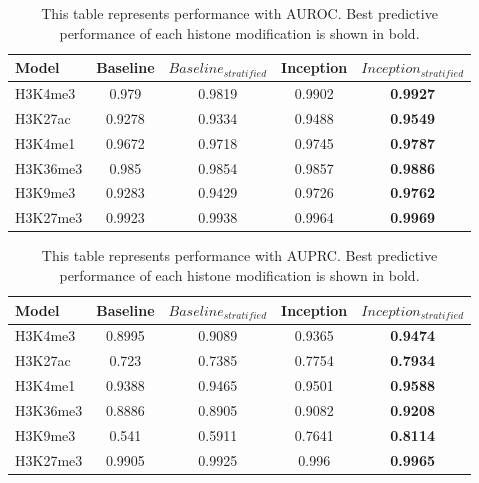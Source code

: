 \begin{table}[H]%
    \centering
    \begin{tabular}{lcccc}
    \hline
    Model & Baseline & $Baseline_{stratified}$ & Inception & $Inception_{stratified}$ \\\hline
    H3K4me3 & 0.979 & 0.9819 & 0.9902 & \textbf{0.9927} \\
    H3K27ac & 0.9278 & 0.9334 & 0.9488 & \textbf{0.9549} \\
    H3K4me1 & 0.9672 & 0.9718 & 0.9745 & \textbf{0.9787} \\
    H3K36me3 & 0.985 & 0.9854 & 0.9857 & \textbf{0.9886} \\
    H3K9me3 & 0.9283 & 0.9429 & 0.9726 & \textbf{0.9762} \\
    H3K27me3 & 0.9923 & 0.9938 & 0.9964 & \textbf{0.9969} \\\hline
    \end{tabular}
    \captionsetup{labelfont=bf}
    \renewcommand{\baselinestretch}{1.0}
    \caption[Comparison of baseline and inception with AUROC]{This table represents performance with AUROC. Best predictive performance of each histone modification is shown in bold.}
    \label{t4}
\end{table}

\begin{table}[H]%
    \centering
    \begin{tabular}{lcccc}
    \hline
    Model & Baseline & $Baseline_{stratified}$ & Inception & $Inception_{stratified}$ \\\hline
    H3K4me3 & 0.8995 & 0.9089 & 0.9365 & \textbf{0.9474} \\
    H3K27ac & 0.723 & 0.7385 & 0.7754 & \textbf{0.7934} \\
    H3K4me1 & 0.9388 & 0.9465 & 0.9501 & \textbf{0.9588} \\
    H3K36me3 & 0.8886 & 0.8905 & 0.9082 & \textbf{0.9208} \\
    H3K9me3 & 0.541 & 0.5911 & 0.7641 & \textbf{0.8114} \\
    H3K27me3 & 0.9905 & 0.9925 & 0.996 & \textbf{0.9965} \\\hline
    \end{tabular}
    \captionsetup{labelfont=bf}
    \renewcommand{\baselinestretch}{1.0}
    \caption[Comparison of baseline and inception with AUPRC]{This table represents performance with AUPRC. Best predictive performance of each histone modification is shown in bold.}
    \label{t5}
\end{table}

